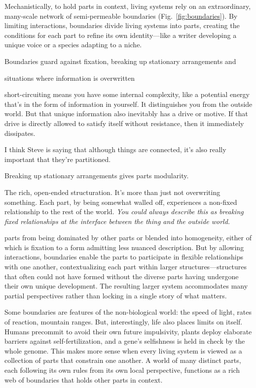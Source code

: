 \documentclass[11pt]{article}
\begin{document}
Mechanistically, to hold parts in context, living systems rely on an extraordinary, many-scale network of semi-permeable boundaries \citep{maturana2012autopoiesis, simon1962architecture, moreno2015biological} (Fig.~\ref{fig:boundaries}). By limiting interactions, boundaries divide living systems into parts, creating the conditions for each part to refine its own identity---like a writer developing a unique voice or a species adapting to a niche. 

Boundaries guard against fixation, breaking up stationary arrangements and 

situations where information is overwritten

short-circuiting means you have some internal complexity, like a potential energy that's in the form of information in yourself. It distinguishes you from the outside world. But that unique information also inevitably has a drive or motive. If that drive is directly allowed to satisfy itself without resistance, then it immediately dissipates. 

I think Steve is saying that although things are connected, it's also really important that they're partitioned. 

Breaking up stationary arrangements gives parts modularity. 

The rich, open-ended structuration. It's more than just not overwriting something. Each part, by being somewhat walled off, experiences a non-fixed relationship to the rest of the world. \textit{You could always describe this as breaking fixed relationships at the interface between the thing and the outside world.} 

parts from being dominated by other parts or blended into homogeneity, either of which is fixation to a form admitting less nuanced description. But by allowing interactions, boundaries enable the parts to participate in flexible relationships with one another, contextualizing each part within larger structures---structures that often could not have formed without the diverse parts having undergone their own unique development. The resulting larger system accommodates many partial perspectives rather than locking in a single story of what matters.

Some boundaries are features of the non-biological world: the speed of light, rates of reaction, mountain ranges. But, interestingly, life also places limits on itself. Humans precommit to avoid their own future impulsivity, plants deploy elaborate barriers against self-fertilization, and a gene's selfishness is held in check by the whole genome. This makes more sense when every living system is viewed as a collection of parts that constrain one another. A world of many distinct parts, each following its own rules from its own local perspective, functions as a rich web of boundaries that holds other parts in context. 
\end{document}
